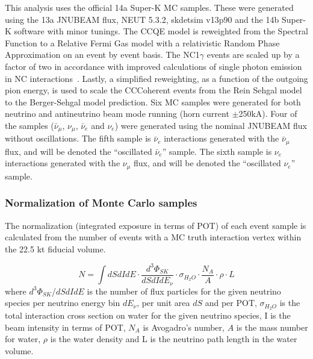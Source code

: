 This analysis uses the official 14a Super-K MC samples. These were generated using the 13a JNUBEAM flux, NEUT 5.3.2, 
skdetsim v13p90 and the 14b Super-K software \cite{SuperkMC14a} with minor tunings. The CCQE model is reweighted 
from the Spectral Function to a Relative Fermi Gas model with a relativistic Random Phase Approximation on an event by 
event basis. The NC1$\gamma$ events are scaled up by a factor of two in accordance with improved calculations of single 
photon emission in NC interactions~\cite{NCGamma}. Lastly, a simplified reweighting, as a function of the outgoing pion energy, is used to scale the CCCoherent events from the Rein Sehgal model to the Berger-Sehgal model prediction.   
Six MC samples were generated for both neutrino and antineutrino beam 
mode running (horn current $\pm$250kA). Four of the samples ($\bar{\nu}_{\mu}$, $\nu_{\mu}$, $\bar{\nu}_{e}$ and $\nu_{e}$) 
were generated using the nominal JNUBEAM flux without oscillations.
The fifth sample is $\bar{\nu}_{e}$ interactions generated with the $\bar{\nu}_{\mu}$ flux, and will be denoted the 
``oscillated $\bar{\nu}_{e}$'' sample. 
The sixth sample is $\nu_{e}$ interactions generated with the $\nu_{\mu}$ flux, 
and will be denoted the ``oscillated $\nu_{e}$'' sample.

\subsubsection {Normalization of Monte Carlo samples}
\label{sec:mc_templates:normalization}


The normalization (integrated exposure in terms of POT) of each event sample is calculated from
the number of events with a MC truth interaction vertex within the 22.5 kt fiducial volume.

\begin{equation}
\displaystyle
  N = \int  dS dI dE \cdot
            \frac{d^{3}\Phi_{SK}}{dS dI dE_{\nu}} \cdot
            \sigma_{H_{2}O} \cdot
            \frac{N_{A}}{A} \cdot \rho \cdot L 
\end{equation}
where 
$d^{3}\Phi_{SK}$/$dS dI dE$ is the number of flux particles for the given neutrino species 
per neutrino energy bin $dE_{\nu}$, per unit area $dS$ and per POT,
$\sigma_{H_{2}O}$ is the total interaction cross section on water
for the given neutrino species,
I is the beam intensity in terms of POT,
$N_{A}$ is  Avogadro's number,
$A$ is the mass number for water,
$\rho$ is the water density
and L is the neutrino path length in the water volume.

